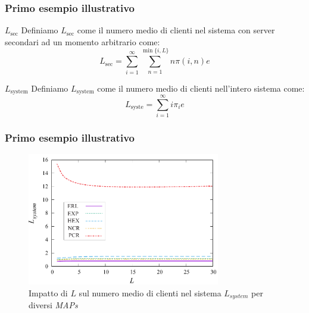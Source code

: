 \documentclass{beamer}
\begin{document}
\begin{frame}
    \frametitle{Primo esempio illustrativo}
    \begin{block}{$L_{\mathrm{sec}}$}
        Definiamo $L_{\mathrm{sec}}$ come il numero medio di clienti nel sistema con server secondari ad un momento arbitrario come:
        $$ L_{\mathrm{sec}} = \sum_{i=1}^{\infty} \sum_{n=1}^{\min\{i,L\}} n \pi (i,n) e $$
    \end{block}
    \begin{block}{$L_{\mathrm{system}}$}
        Definiamo $L_{\mathrm{system}}$ come il numero medio di clienti nell'intero sistema come:
        $$ L_{\mathrm{syste}} = \sum_{i=1}^{\infty} i \pi_i e $$
    \end{block}
\end{frame}

\begin{frame}
    \frametitle{Primo esempio illustrativo}
    \begin{figure}[h]
        \centering
        \includegraphics[width=0.75\textwidth]{gtHnIzQ.png}
        \caption{Impatto di $L$ sul numero medio di clienti nel sistema $L_{system}$ per diversi \emph{MAPs}}
        \label{fig:1}
    \end{figure}
\end{frame}


\end{document}
